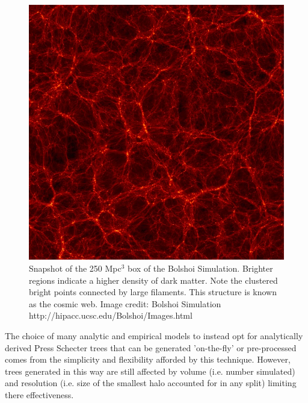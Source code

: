 \begin{figure}[h]
    \centering
    \includegraphics[width = \linewidth]{Figures/Chapter2/Bolshoi.jpg}
    \caption{Snapshot of the 250 Mpc$^3$ box of the Bolshoi Simulation. Brighter regions indicate a higher density of dark matter. Note the clustered bright points connected by large filaments. This structure is known as the cosmic web.
    Image credit: Bolshoi Simulation http://hipacc.ucsc.edu/Bolshoi/Images.html}
    \label{fig:Bolshoi}
\end{figure}

The choice of many analytic and empirical models to instead opt for analytically derived Press Schecter trees that can be generated 'on-the-fly' or pre-processed comes from the simplicity and flexibility afforded by this technique. However, trees generated in this way are still affected by volume (i.e. number simulated) and resolution (i.e. size of the smallest halo accounted for in any split) limiting there effectiveness.

